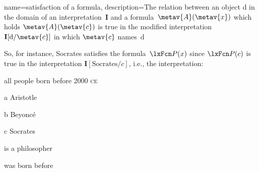 
{
  name=satisfaction of a formula,
  description={The relation between an object d in the \gls{domain} of an
    \gls{interpretation}~$\mathbf{I}$ and a
    \gls{formula}~$\metav{A}(\metav{x})$ which holds \ifeff{}
    $\metav{A}(\metav{c})$ is true in the modified interpretation
    $\mathbf{I}[\text{d}/\metav{c}]$ in which $\metav{c}$ names~d}
}

So, for instance, Socrates satisfies the formula~$\atom{P}{x}$ since $\atom{P}{c}$ is true in the interpretation $\mathbf{I}[\text{Socrates}/c]$, i.e., the interpretation:
\begin{ekey}
	\item[\text{domain}] all people born before 2000 \textsc{ce}
	\item[a] Aristotle
	\item[b] Beyonc\'e
	\item[c] Socrates 
	\item[\atom{P}{x}]  is a philosopher
	\item[\atom{R}{x,y}]  was born before 
\end{ekey}

